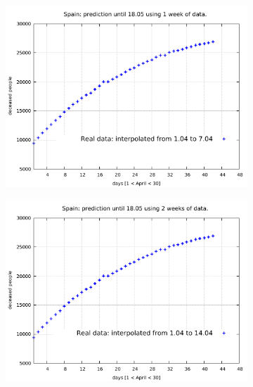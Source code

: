 \documentclass[8pt]{article}
\begin{document}
\begin{figure}[h!]
  \centering
  \begin{subfigure}[b]{0.45\linewidth}
  \includegraphics[width=\linewidth]{../tuned/sp/1-7/1-7.pdf}
  \end{subfigure}
  \begin{subfigure}[b]{0.45\linewidth}
    \includegraphics[width=\linewidth]{../tuned/sp/1-14/1-14.pdf}
  \end{subfigure}
  \begin{subfigure}[b]{0.45\linewidth}

\end{subfigure}
\end{figure}
\end{document}
